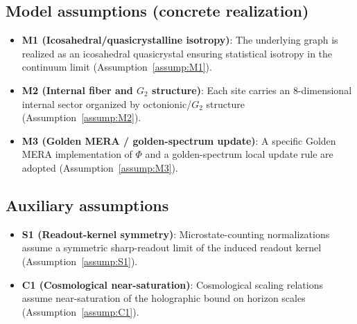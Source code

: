 \subsection{Model assumptions (concrete realization)}
\begin{itemize}
    \item \textbf{M1 (Icosahedral/quasicrystalline isotropy)}: The underlying graph is realized as an icosahedral quasicrystal ensuring statistical isotropy in the continuum limit (Assumption~\ref{assump:M1}).
    \item \textbf{M2 (Internal fiber and $G_2$ structure)}: Each site carries an $8$-dimensional internal sector organized by octonionic/$G_2$ structure (Assumption~\ref{assump:M2}).
    \item \textbf{M3 (Golden MERA / golden-spectrum update)}: A specific Golden MERA implementation of $\Phi$ and a golden-spectrum local update rule are adopted (Assumption~\ref{assump:M3}).
\end{itemize}

\subsection{Auxiliary assumptions}
\begin{itemize}
    \item \textbf{S1 (Readout-kernel symmetry)}: Microstate-counting normalizations assume a symmetric sharp-readout limit of the induced readout kernel (Assumption~\ref{assump:S1}).
    \item \textbf{C1 (Cosmological near-saturation)}: Cosmological scaling relations assume near-saturation of the holographic bound on horizon scales (Assumption~\ref{assump:C1}).
\end{itemize}

